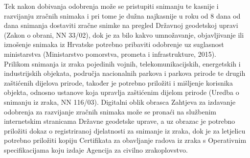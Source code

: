 \documentclass[times, utf8, diplomski]{fer}
\begin{document}
Tek nakon dobivanja odobrenja može se pristupiti snimanju te kasnije i razvijanju zračnih snimaka i pri tome je dužna najkasnije u roku od 8 dana od dana snimanja dostaviti zračne snimke na pregled Državnoj geodetskoj upravi (Zakon o obrani, NN 33/02), dok je za bilo kakvo umnožavanje, objavljivanje ili iznošenje snimaka iz Hrvatske potrebno  pribaviti  odobrenje  uz  suglasnost  ministarstva (Ministarstvo  pomorstva,  prometa  i infrastrukture, 2015).\\
Prilikom snimanja iz zraka pojedinih vojnih, telekomunikacijskih, energetskih i industrijskih objekata, područja nacionalnih parkova i parkova prirode te drugih zaštićenih dijelova prirode, također je potrebno priložiti i mišljenje korisnika objekta, odnosno ustanove koja upravlja zaštićenim dijelom prirode (Uredba o snimanju iz zraka, NN 116/03). Digitalni oblik obrasca Zahtjeva za izdavanje odobrenja za razvijanje zračnih snimaka može se pronaći na službenim internetskim stranicama Državne geodetske uprave, a uz obrazac je potrebno priložiti dokaz o registriranoj djelatnosti za snimanje iz zraka, dok je za letjelicu potrebno priložiti kopiju Certifikata za obavljanje radova iz zraka s Operativnim specifikacijama koju izdaje Agencija za civilno zrakoplovstvo.\\
\end{document}
